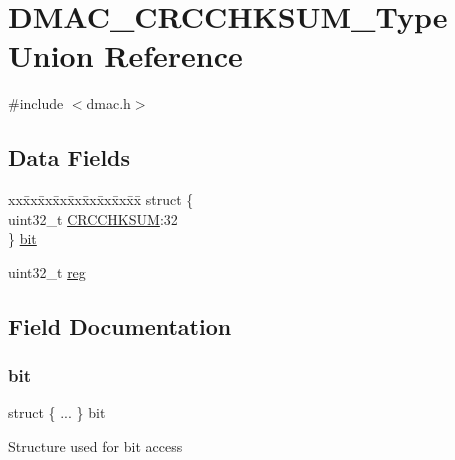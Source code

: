 \hypertarget{union_d_m_a_c___c_r_c_c_h_k_s_u_m___type}{}\section{D\+M\+A\+C\+\_\+\+C\+R\+C\+C\+H\+K\+S\+U\+M\+\_\+\+Type Union Reference}
\label{union_d_m_a_c___c_r_c_c_h_k_s_u_m___type}


{\ttfamily \#include $<$dmac.\+h$>$}

\subsection*{Data Fields}
\begin{DoxyCompactItemize}
\item 
\begin{tabbing}
xx\=xx\=xx\=xx\=xx\=xx\=xx\=xx\=xx\=\kill
struct \{\\
\>uint32\_t \mbox{\hyperlink{union_d_m_a_c___c_r_c_c_h_k_s_u_m___type_a0815f4ad10aa6b8120c59ae85cbcfb9c}{CRCCHKSUM}}:32\\
\} \mbox{\hyperlink{union_d_m_a_c___c_r_c_c_h_k_s_u_m___type_a04a1327ac2dabdbcb03e640c91729b95}{bit}}\\

\end{tabbing}\item 
uint32\+\_\+t \mbox{\hyperlink{union_d_m_a_c___c_r_c_c_h_k_s_u_m___type_a6b91636401516a477989a336376d7b40}{reg}}
\end{DoxyCompactItemize}


\subsection{Field Documentation}
\mbox{\label{union_d_m_a_c___c_r_c_c_h_k_s_u_m___type_a04a1327ac2dabdbcb03e640c91729b95}} 
\subsubsection{\texorpdfstring{bit}{bit}}
{\footnotesize\ttfamily struct \{ ... \}   bit}

Structure used for bit access \mbox{\label{union_d_m_a_c___c_r_c_c_h_k_s_u_m___type_a0815f4ad10aa6b8120c59ae85cbcfb9c}} 
